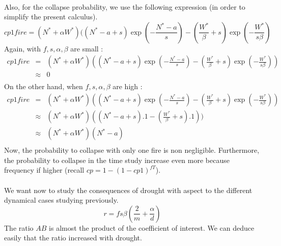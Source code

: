 \documentclass{article}
\begin{document}
\paragraph{}
Also, for the collapse probability, we use the following expression (in order to simplify the present calculus).
\[
cp1fire = (N^*+\alpha W^*)((N^*-a+s)\exp(-\frac{N^*-a}{s}) - (\frac{W^*}{\beta}+s)\exp(-\frac{W^*}{s\beta})
\]
Again, with $f, s, \alpha, \beta$ are small :
\[
\begin{array}{rcl}
cp1fire & = & (N^*+\alpha W^*)((N^*-a+s)\exp(-\frac{N^*-a}{s}) - (\frac{W^*}{\beta}+s)\exp(-\frac{W^*}{s\beta})) \\
& \approx & 0 \\
\end{array}
\]
On the other hand, when $f, s, \alpha, \beta$ are high :
\[
\begin{array}{rcl}
cp1fire & = & (N^*+\alpha W^*)((N^*-a+s)\exp(-\frac{N^*-a}{s}) - (\frac{W^*}{\beta}+s)\exp(-\frac{W^*}{s\beta})) \\
& \approx & (N^*+\alpha W^*)((N^*-a+s).1 - (\frac{W^*}{\beta}+s).1)) \\
& \approx & (N^*+\alpha W^*)(N^*-a) \\
\end{array}
\]
Now, the probability to collapse with only one fire is non negligible. Furthermore, the probability to collapse in the time study increase even more because frequency if higher (recall $cp = 1-(1-cp1)^{fT}$).

\paragraph{}
We want now to study the consequences of drought with aspect to the different dynamical cases studying previously.
\[
r = fs\beta(\frac{2}{m}+\frac{\alpha}{d})
\]
The ratio $AB$ is almost the product of the coefficient of interest. We can deduce easily that the ratio increased with drought.
\end{document}
